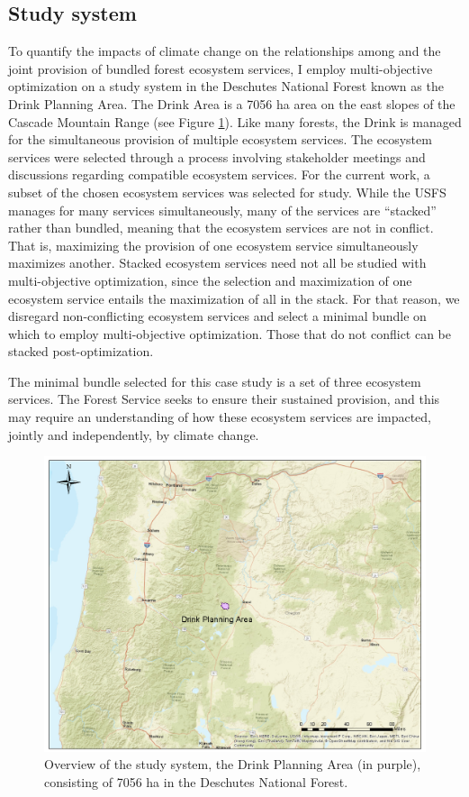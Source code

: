 \subsection{Study system}
\label{subsec:studyArea}
To quantify the impacts of climate change on the relationships among and the joint provision of bundled forest ecosystem services, I employ multi-objective optimization on a study system in the Deschutes National Forest known as the Drink Planning Area. The Drink Area is a 7056 ha area on the east slopes of the Cascade Mountain Range (see Figure \ref{fig:drinkOverview}). Like many forests, the Drink is managed for the simultaneous provision of multiple ecosystem services.  The ecosystem services were selected through a process involving stakeholder meetings and discussions regarding compatible ecosystem services. For the current work, a subset of the chosen ecosystem services was selected for study. While the USFS manages for many services simultaneously, many of the services are ``stacked'' rather than bundled, meaning that the ecosystem services are not in conflict. That is, maximizing the provision of one ecosystem service simultaneously maximizes another. Stacked ecosystem services need not all be studied with multi-objective optimization, since the selection and maximization of one ecosystem service entails the maximization of all in the stack. For that reason, we disregard non-conflicting ecosystem services and select a minimal bundle on which to employ multi-objective optimization. Those that do not conflict can be stacked post-optimization.

The minimal bundle selected for this case study is a set of three ecosystem services. The Forest Service seeks to ensure their sustained provision, and this may require an understanding of how these ecosystem services are impacted, jointly and independently, by climate change.

\begin{figure}[ht]
\centering
\includegraphics[width=.85\textwidth]{../images/DrinkMap_Overview}
\caption[Overview of the study system, the Drink Planning Area]{Overview of the study system, the Drink Planning Area (in purple), consisting of 7056 ha in the Deschutes National Forest.}
\label{fig:drinkOverview}
\end{figure}


